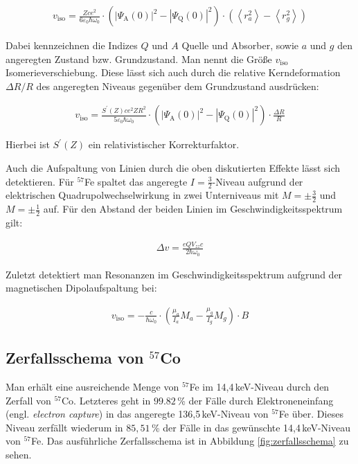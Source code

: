 \documentclass[
a4paper,                %
titlepage=firstiscover, %
captions=tableheading,  %
toc=bibliography,       %
toc=listof,             %
oneside,                %
automark,               %
12pt,                   %
english, ngerman,       %
parskip = half,         %
]{scrartcl}
\begin{document}
\begin{align}
v_\text{iso}=\frac{Zce^2}{6\varepsilon_0\hbar\omega_0}\cdot\left( \left| \Psi_\text{A}(0)\right|^2 - \left| \Psi_\text{Q}(0)\right|^2\right)\cdot\left( \left\langle r_a^2\right\rangle - \left\langle r_g^2\right\rangle\right) 
\end{align}

\noindent Dabei kennzeichnen die Indizes $Q$ und $A$ Quelle und Absorber, sowie $a$ und $g$ den angeregten Zustand bzw. Grundzustand.
Man nennt die Größe $v_\text{iso}$ Isomerieverschiebung.
Diese lässt sich auch durch die relative Kerndeformation $\Delta R /R$ des angeregten Niveaus gegenüber dem Grundzustand ausdrücken:

\begin{align} \label{relAenderungKernladungsradius}
v_\text{iso}=\frac{S^{\prime}(Z)ce^{2}ZR^2}{5\varepsilon_{0}\hbar\omega_{0}}\cdot\left( \left| \Psi_\text{A}(0)\right|^2 - \left| \Psi_\text{Q}(0)\right|^2\right)\cdot\frac{\Delta R}{R}
\end{align}

\noindent Hierbei ist $S^\prime(Z)$ ein relativistischer Korrekturfaktor. 

Auch die Aufspaltung von Linien durch die oben diskutierten Effekte lässt sich detektieren.
Für $^{57}$Fe spaltet das angeregte $I=\frac{3}{2}$-Niveau aufgrund der elektrischen Quadrupolwechselwirkung in zwei Unterniveaus mit $M=\pm \frac{3}{2}$ und $M=\pm \frac{1}{2}$ auf.
Für den Abstand der beiden Linien im Geschwindigkeitsspektrum gilt:

\begin{align}
\Delta v=\frac{eQV_{zz}c}{2\hbar\omega_0}
\end{align}

\noindent Zuletzt detektiert man Resonanzen im Geschwindigkeitsspektrum aufgrund der magnetischen Dipolaufspaltung bei:

\begin{align}
v_\text{iso}=-\frac{c}{\hbar\omega_0}\cdot\left(\frac{\mu_a}{I_a}M_a - \frac{\mu_g}{I_g}M_g \right)\cdot B
\end{align}


\subsection{Zerfallsschema von $^{57}$Co} \label{ZerfallCobalt57}

Man erhält eine ausreichende Menge von $^{57}$Fe im 14,4\,keV-Niveau durch den Zerfall von $^{57}$Co.
Letzteres geht in $99.82\,$\% der Fälle durch Elektroneneinfang (engl. \emph{electron capture}) in das angeregte 136,5\,keV-Niveau von $^{57}$Fe über.
Dieses Niveau zerfällt wiederum in $85,51\,$\% der Fälle in das gewünschte 14,4\,keV-Niveau von $^{57}$Fe.
Das ausführliche Zerfallsschema ist in Abbildung \ref{fig:zerfallsschema} zu sehen.
\end{document}
